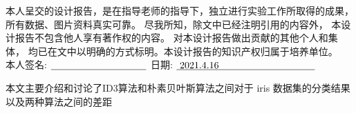 

\newpage
\thispagestyle{empty}
\vspace*{20pt}
\begin{center}{}\end{center}
\par\vspace*{30pt}
\renewcommand{\baselinestretch}{2}

{%

本人呈交的设计报告，是在指导老师的指导下，独立进行实验工作所取得的成果，
所有数据、图片资料真实可靠。 尽我所知，除文中已经注明引用的内容外，
本设计报告不包含他人享有著作权的内容。
对本设计报告做出贡献的其他个人和集体，
均已在文中以明确的方式标明。本设计报告的知识产权归属于培养单位。\\[2cm]

\hspace*{1cm}本人签名: $\underline{\hspace{3.5cm}}$
\hspace{2cm}日期: $\underline{\ 2021.4.16 \hspace{3.5cm}}$\hfill\par}
\baselineskip=23pt  %





\begin{cnabstract}
\thispagestyle{empty}

本文主要介绍和讨论了ID3算法和朴素贝叶斯算法之间对于 iris 数据集的分类结果以及两种算法之间的差距


\end{cnabstract}
\par
\vspace*{2em}





